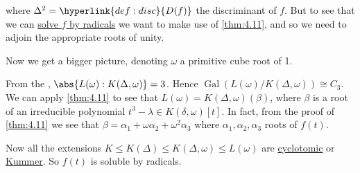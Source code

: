 \documentclass{article}
\DeclareMathOperator{\Gal}{Gal}
\begin{document}
\begin{center}
\end{center}
where $\Delta^2 = \hyperlink{def:disc}{D(f)}$ the discriminant of $f$.
But to see that we can \hyperlink{def:radicals}{solve $f$ by radicals} we want to make use of \cref{thm:4.11}, and so we need to adjoin the appropriate roots of unity.

Now we get a bigger picture, denoting $\omega$ a primitive cube root of 1.
\begin{center}
\end{center}
From the , $\abs{L(\omega):K(\Delta, \omega)} = 3$. Hence $\Gal(L(\omega)/K(\Delta, \omega)) \cong C_3$.
We can apply \cref{thm:4.11} to see that $L(\omega) = K(\Delta, \omega)(\beta)$, where $\beta$ is a root of an irreducible polynomial $t^3 - \lambda \in K(\delta, \omega)[t]$.
In fact, from the proof of \cref{thm:4.11} we see that $\beta = \alpha_1 + \omega \alpha_2 + \omega^2 \alpha_3$ where $\alpha_1, \alpha_2, \alpha_3$ roots of $f(t)$.

Now all the extensions $K \leq K(\Delta) \leq K(\Delta, \omega) \leq L(\omega)$ are \hyperlink{def:cycloExt}{cyclotomic} or \hyperlink{def:kummerExt}{Kummer}.
So $f(t)$ is soluble by radicals.
\end{document}
